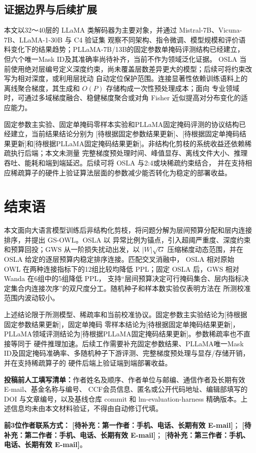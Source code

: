 \documentclass[UTF8,fontset=fandol]{ctexart}
\newcommand{\method}{GS-OWL}
\newcommand{\placeholder}[1]{\textbf{[待补充：#1]}}
\begin{document}
\subsection{证据边界与后续扩展}

本文以32～40层的 LLaMA 类解码器为主要对象，并通过 Mistral-7B、Vicuna-7B、LLaMA-1-30B 与 C4 验证集
观察不同架构、指令微调、模型规模和评价语料变化下的结果趋势；PLLaMA-7B/13B的固定参数单掩码评测结构已经建立，
但六个唯一Mask ID及其准确率尚待补齐，当前不作为领域泛化证据。
OSLA 当前使用绝对层编号定义深度约束，尚未覆盖层数差异更大的模型；后续可将约束改写为相对深度，或利用层扰动
自动定位保护范围。连接显著性依赖训练语料上的离线聚合梯度，其生成和 $O(P)$ 存储构成一次性预处理成本；面向
专业领域时，可通过多域梯度融合、稳健梯度聚合或对角 Fisher 近似提高对分布变化的适应能力。

固定参数主实验、固定单掩码零样本实验和PLLaMA固定掩码评测的协议结构已经建立，当前结果结论分别为
[待根据固定参数结果更新]、[待根据固定单掩码结果更新]和[待根据PLLaMA固定掩码结果更新]。非结构化剪枝的系统收益还依赖稀疏执行后端；本文未测量
完整梯度预处理时间、峰值显存、离线文件大小、推理吞吐、能耗和端到端延迟。后续可将 OSLA 与2:4或块稀疏约束结合，
并在支持相应稀疏算子的硬件上验证算法层面的参数减少能否转化为稳定的部署收益。

\section{结束语}

本文面向大语言模型训练后非结构化剪枝，将问题分解为层间预算分配和层内连接排序，并提出 \method。OSLA 以
异常比例为锚点，引入超阈严重度、深度约束和预算回投；GWS 从一阶损失扰动出发，以
$\lvert W\rvert\sqrt{G}$ 压缩梯度动态范围，并在 OSLA 给定的逐层预算内稳定排序连接。匹配交叉消融中，
OSLA 相对原始 OWL 在两种连接指标下的12组比较均降低 PPL；固定 OSLA 后，GWS 相对 Wanda 在6组中的5组降低 PPL，
支持“层间预算决定可行掩码集合、层内指标决定集合内连接次序”的双尺度分工。随机种子和样本数实验仅表明方法在
所测校准范围内波动较小。

上述结论限于所测模型、稀疏率和当前校准协议。固定参数主实验结论为[待根据固定参数结果更新]，固定单掩码
零样本结论为[待根据固定单掩码结果更新]，PLLaMA领域评测结论为[待根据PLLaMA固定掩码结果更新]。参数稀疏率也不直接等同于
硬件推理加速。后续工作需要补充固定参数结果、PLLaMA唯一Mask ID及固定掩码准确率、多随机种子下游评测、完整梯度预处理与显存/存储开销，并在支持稀疏算子的
硬件后端上验证端到端部署收益。

\vspace{3pt}
\noindent\textbf{投稿前人工填写清单：}作者姓名及顺序、作者单位与邮编、通信作者及长期有效 E-mail、基金名称与编号、
CCF会员信息、匿名或公开代码地址、编辑部填写的 DOI 与文章编号，以及基线仓库 commit 和
lm-evaluation-harness 精确版本。上述信息均未由本文材料验证，不得由自动修订代填。

\FloatBarrier


\vspace{4pt}
\noindent\textbf{前3位作者联系方式：}
\placeholder{第一作者：手机、电话、长期有效 E-mail}；
\placeholder{第二作者：手机、电话、长期有效 E-mail}；
\placeholder{第三作者：手机、电话、长期有效 E-mail}。
\end{document}
